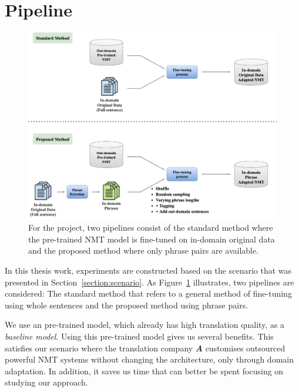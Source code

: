 \section{Pipeline}\label{section:pipeline}

\begin{figure}[h]
    \centering
    \includegraphics[scale=0.41]{images/pipeline.png}
    \caption{For the project, two pipelines consist of the standard method where the pre-trained NMT model is fine-tuned on in-domain original data and the proposed method where only phrase pairs are available.}
    \label{fig:pipeline}
\end{figure}

In this thesis work, experiments are constructed based on the scenario that was presented in Section~\ref{section:scenario}.
As Figure~\ref{fig:pipeline} illustrates, two pipelines are considered: The standard method that refers to a general method of fine-tuning using whole sentences and the proposed method using phrase pairs. 

We use an pre-trained model, which already has high translation quality, as a \textit{baseline model}. Using this pre-trained model gives us several benefits. This satisfies our scenario where the translation company \textbf{\textit{A}} customises outsourced powerful NMT systems without changing the architecture, only through domain adaptation. In addition, it saves us time that can better be spent focusing on studying our approach.

